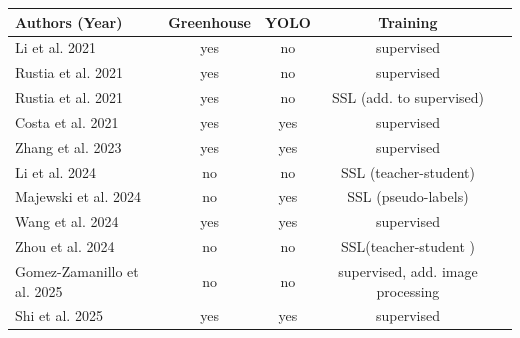 \documentclass[12pt, a4paper]{article}
\begin{document}
\begin{table}[!t]
\centering
{\footnotesize
\begin{tabularx}{\textwidth}{l c c c l}
\hline
\textbf{Authors (Year)} & \textbf{Greenhouse} & \textbf{YOLO} & \textbf{Training}  \\
\hline

Li et al. 2021 \cite{li_field_2021}
& \cellcolor{green!40}yes & \cellcolor{red!40}no & \cellcolor{red!40} supervised \\

Rustia et al. 2021 \cite{rustia_automatic_2021}
& \cellcolor{green!40}yes & \cellcolor{red!40}no & \cellcolor{red!40} supervised \\

Rustia et al. 2021 \cite{rustia_online_2021}
& \cellcolor{green!40}yes & \cellcolor{red!40}no & \cellcolor{orange!40} SSL (add. to supervised)\\

Costa et al. 2021 \cite{costa_intelligent_2023}
& \cellcolor{green!40}yes & \cellcolor{green!40}yes & \cellcolor{red!40} supervised \\

Zhang et al. 2023 \cite{zhang_automatic_2023} 
& \cellcolor{green!40}yes & \cellcolor{green!40}yes & \cellcolor{red!40} supervised \\

Li et al. 2024 \cite{li_mateacher_2024}
& \cellcolor{red!40}no & \cellcolor{red!40}no & \cellcolor{orange!40} SSL (teacher-student) \\

Majewski et al. 2024 \cite{majewski_improved_2024}
& \cellcolor{red!40}no & \cellcolor{green!40}yes & \cellcolor{orange!40} SSL (pseudo-labels) \\

Wang et al. 2024 \cite{wang_deep-learning-based_2024}
& \cellcolor{green!40}yes & \cellcolor{green!40}yes & \cellcolor{red!40} supervised \\

Zhou et al. 2024 \cite{zhou_mutual_2024}
& \cellcolor{red!40}no & \cellcolor{red!40}no & \cellcolor{orange!40} SSL(teacher-student ) \\

Gomez-Zamanillo et al. 2025  \cite{gomez-zamanillo_semi-supervised_2025}
& \cellcolor{red!40}no & \cellcolor{red!40}no & \cellcolor{orange!40} supervised, add. image processing \\

Shi et al. 2025 \cite{shi_small_2025}
& \cellcolor{green!40}yes & \cellcolor{green!40}yes & \cellcolor{red!40} supervised \\


\end{tabularx}}
\end{table}
\end{document}
